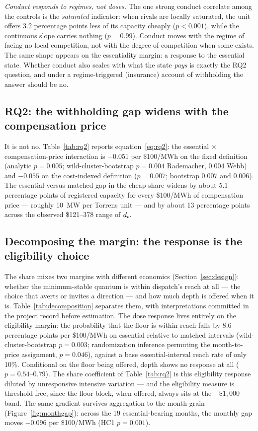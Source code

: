 \emph{Conduct responds to regimes, not doses.} The one strong conduct
correlate among the controls is the \emph{saturated} indicator: when rivals
are locally saturated, the unit offers 3.2 percentage points less of its
capacity cheaply ($p<0.001$), while the continuous slope carries nothing
($p=0.99$). Conduct moves with the regime of facing no local competition, not
with the degree of competition when some exists. The same shape appears on the
essentiality margin: a response to the essential state. Whether conduct also
scales with what the state \emph{pays} is exactly the RQ2 question, and under
a regime-triggered (insurance) account of withholding the answer should be no.

\subsection{RQ2: the withholding gap widens with the compensation price}

It is not no. Table~\ref{tab:rq2} reports equation~\eqref{eq:rq2}: the
essential $\times$ compensation-price interaction is $-0.051$ per \$100/MWh
on the fixed definition (analytic $p=0.005$; wild-cluster-bootstrap $p=0.004$
Rademacher, $0.004$ Webb) and $-0.055$ on the cost-indexed definition
($p=0.007$; bootstrap $0.007$ and $0.006$). The essential-versus-matched gap in the cheap
share widens by about 5.1 percentage points of registered capacity for every
\$100/MWh of compensation price --- roughly 10~MW per Torrens unit --- and by
about 13 percentage points across the observed \$121--378 range of $d_t$.

\subsection{Decomposing the margin: the response is the eligibility choice}

The share mixes two margins with different economics
(Section~\ref{sec:design}): whether the minimum-stable quantum is within
dispatch's reach at all --- the choice that averts or invites a direction
--- and how much depth is offered when it is. Table~\ref{tab:decomposition}
separates them, with interpretations committed in the project record before
estimation. The dose response lives entirely on the eligibility margin: the
probability that the floor is within reach falls by 8.6 percentage points
per \$100/MWh on essential relative to matched intervals
(wild-cluster-bootstrap $p=0.003$; randomization inference permuting the
month-to-price assignment, $p=0.046$), against a base essential-interval
reach rate of only 10\%. Conditional on the floor being offered, depth shows
no response at all ($p=0.54$--$0.79$). The share coefficient of
Table~\ref{tab:rq2} is this eligibility response diluted by unresponsive
intensive variation --- and the eligibility measure is threshold-free, since
the floor block, when offered, always sits at the $-\$1{,}000$ band. The
same gradient survives aggregation to the month grain
(Figure~\ref{fig:monthgap}): across the 19 essential-bearing months, the
monthly gap moves $-0.096$ per \$100/MWh (HC1 $p=0.001$).

